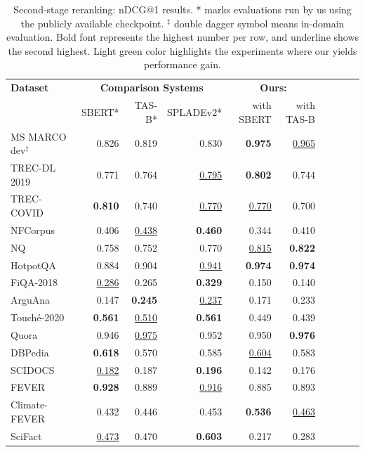 \documentclass{article}
\begin{document}
\begin{table}[tb!] 
    \caption{Second-stage reranking: nDCG@1 results. * marks evaluations run by us using the publicly available checkpoint. $^\ddagger$ double dagger symbol means in-domain evaluation. Bold font represents the highest number per row, and underline shows the second highest. Light green color highlights the experiments where our \alg{} yields performance gain.} 
    \vspace{5pt}
    \centering \small
    \begin{tabular}{l r r r r r r r r r }
        \toprule
        \textbf{Dataset} & \multicolumn{3}{c}{\textbf{Comparison Systems}} & \multicolumn{2}{c}{\textbf{Ours: \alg{}}} \\
            & SBERT* & TAS-B* & SPLADEv2* & with SBERT & with TAS-B   \\ 
        \midrule
MS MARCO dev$^\ddagger$ & 0.826 & 0.819 & 0.830 & \cellcolor{lightgreen}\textbf{0.975} & \cellcolor{lightgreen}\underline{0.965}\\
TREC-DL 2019 & 0.771 & 0.764 & \underline{0.795} & \cellcolor{lightgreen}\textbf{0.802} & 0.744\\
TREC-COVID & \textbf{0.810} & 0.740 & \underline{0.770} & \underline{0.770} & 0.700\\
NFCorpus & 0.406 & \underline{0.438} & \textbf{0.460} & 0.344 & 0.410\\
NQ & 0.758 & 0.752 & 0.770 & \cellcolor{lightgreen}\underline{0.815} & \cellcolor{lightgreen}\textbf{0.822}\\
HotpotQA & 0.884 & 0.904 & \underline{0.941} & \cellcolor{lightgreen}\textbf{0.974} & \cellcolor{lightgreen}\textbf{0.974}\\
FiQA-2018 & \underline{0.286} & 0.265 & \textbf{0.329} & 0.150 & 0.140\\
ArguAna & 0.147 & \textbf{0.245} & \underline{0.237} & \cellcolor{lightgreen}0.171 & 0.233\\
Touché-2020   & \textbf{0.561} & \underline{0.510} & \textbf{0.561} & 0.449 & 0.439\\
Quora & 0.946 & \underline{0.975} & 0.952 & \cellcolor{lightgreen}0.950 & \cellcolor{lightgreen}\textbf{0.976}\\
DBPedia & \textbf{0.618} & 0.570 & 0.585 & \underline{0.604} & \cellcolor{lightgreen}0.583\\
SCIDOCS & \underline{0.182} & 0.187 & \textbf{0.196} & 0.142 & 0.176\\
FEVER & \textbf{0.928} & 0.889 & \underline{0.916} & 0.885 & \cellcolor{lightgreen}0.893\\
Climate-FEVER & 0.432 & 0.446 & 0.453 & \cellcolor{lightgreen}\textbf{0.536} & \cellcolor{lightgreen}\underline{0.463}\\
SciFact & \underline{0.473} & 0.470 & \textbf{0.603} & 0.217 & 0.283\\
        \bottomrule
    \end{tabular}
    \label{tab:eval_rerank_ndcg1}
\end{table}
\end{document}
